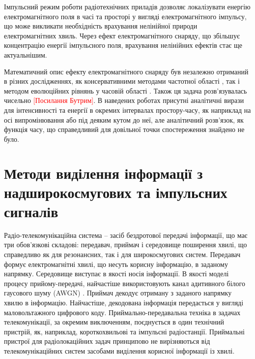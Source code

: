 Імпульсний режим роботи радіотехнічних приладів дозволяє локалізувати енергію 
електромагнітного поля в часі та просторі у вигляді електромагнітного 
імпульсу, що може викликати необхідність врахування нелінійної природи 
електромагнітних хвиль. Через ефект електромагнітного снаряду, що збільшує 
концентрацію енергії імпульсного поля, врахування нелінійних ефектів стає 
ще актуальнішим.

Математичний опис ефекту електромагнітного снаряду був незалежно отриманий 
в різних дослідженнях, як консервативними методами частотної області
\cite{imp:Wu1987, imp:Samsonov1986}, так і методом еволюційних рівнянь у 
часовій області \cite{imp:Dumin1996}. Також ця задача розв'язувалась 
чисельно \textcolor{red}{[Посилання Бутрим]}. В наведених роботах присутні
аналітичні вирази для інтенсивності та енергії в окремих інтервалах 
простору-часу, як наприклад на осі випромінювання або під деяким кутом до 
неї, але аналітичний розв'язок, як функція часу, що справедливий для 
довільної точки спостереження знайдено не було.

\section{Методи виділення інформації з надширокосмугових та імпульсних сигналів}

Радіо-телекомунікаційна система -- засіб бездротової передачі інформації, що 
має три обов'язкові складові: передавач, приймач і середовище поширення 
хвилі, що справедливо як для резонансних, так і для широкосмугових систем. 
Передавач формує електромагнітні хвилі,  що несуть корисну інформацію, в 
заданому напрямку. Середовище виступає в якості носія інформації. В якості 
моделі процесу прийому-передачі, найчастіше використовують канал адитивного 
білого гаусового шуму (AWGN) \cite{imp:Lazorenko2009}. Приймач декодує 
отриману з заданого напрямку хвилю в інформацію. Найчастіше, декодована 
інформація передасться у вигляді маловольтажного цифрового коду. 
Приймально-передавальна техніка в задачах телекомунікації, за окремим 
виключенням, поєднується в один технічний пристрій, як, наприклад, 
короткохвильові та імпульсні радіостанції. Приймальні пристрої для 
радіолокаційних задач принципово не вирізняються від телекомунікаційних 
систем засобами виділення корисної інформації із хвилі.


